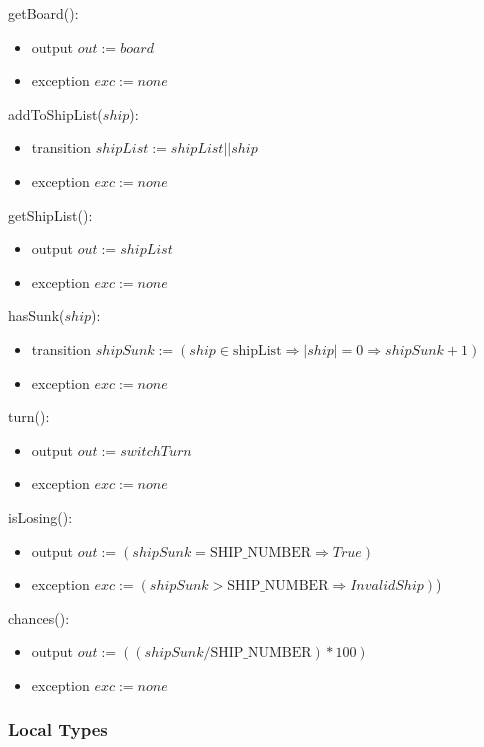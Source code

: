 \documentclass[12pt]{article}
\begin{document}
\noindent getBoard():
\begin{itemize}
\item output $out := board$
\item exception $exc := none$
\end{itemize}

\noindent addToShipList($ship$):
\begin{itemize}
\item transition $shipList := shipList || ship$
\item exception $exc := none$
\end{itemize}

\noindent getShipList():
\begin{itemize}
\item output $out := shipList$
\item exception $exc := none$
\end{itemize}

\noindent hasSunk($ship$):
\begin{itemize}
\item transition $ shipSunk := (ship \in \mbox{shipList} \Rightarrow |ship| = 0 \Rightarrow shipSunk+1)$
\item exception $exc := none$
\end{itemize}

\noindent turn():
\begin{itemize}
\item output $ out := switchTurn $
\item exception $exc := none$
\end{itemize}

\noindent isLosing():
\begin{itemize}
\item output $out := (shipSunk = \mbox{SHIP\_NUMBER} \Rightarrow True)$
\item exception $exc := (shipSunk > \mbox{SHIP\_NUMBER} \Rightarrow InvalidShip)$)
\end{itemize}

\noindent chances():
\begin{itemize}
\item output $out := ((shipSunk / \mbox{SHIP\_NUMBER})*100)$
\item exception $exc := none$
\end{itemize}

\subsubsection* {Local Types}
\end{document}
